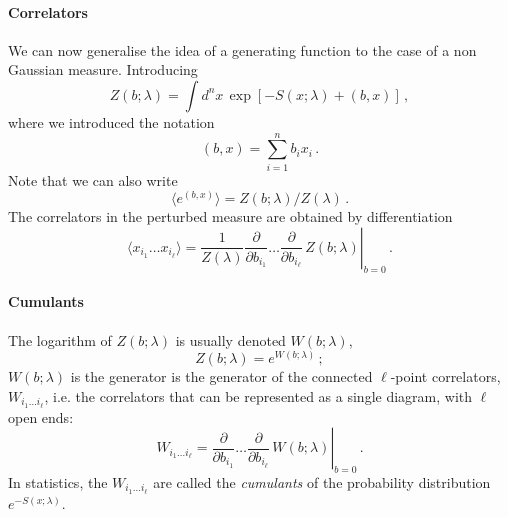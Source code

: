\documentclass[notes.tex]{subfiles}
\begin{document}
\paragraph{Correlators}

We can now generalise the idea of a generating function to the case of
a non Gaussian measure. Introducing
\begin{equation}
  \label{eq:GenFunctPert}
  Z(b;\lambda) = \int d^nx\, \exp\left[
    -S(x;\lambda) + (b,x)
    \right]\, ,
\end{equation}
where we introduced the notation
\begin{equation}
  \label{eq:ScalProd}
  (b,x) = \sum_{i=1}^n b_i x_i\, .
\end{equation}
Note that we can also write
\begin{equation}
  \label{eq:GenFunctPertTwo}
  \langle e^{(b,x)} \rangle = Z(b;\lambda)/Z(\lambda)\, .
\end{equation}
The correlators in the perturbed measure are obtained by
differentiation
\begin{equation}
  \label{eq:CorrGenPert}
  \langle x_{i_1} \ldots x_{i_\ell}\rangle = \frac{1}{Z(\lambda)} \left.
  \frac{\partial}{\partial b_{i_1}} \ldots \frac{\partial}{\partial b_{i_\ell}}\,
  Z(b;\lambda)
\right|_{b=0} \, .
\end{equation}

\paragraph{Cumulants}

The logarithm of $Z(b;\lambda)$ is usually denoted $W(b;\lambda)$, 
\begin{equation}
  \label{eq:WGenDef}
  Z(b;\lambda) = e^{W(b;\lambda)}\, ;
\end{equation}
$W(b;\lambda)$ is the generator is the generator of the connected
$\ell$-point correlators, $W_{i_1 \ldots i_\ell}$, i.e. the correlators that can be represented as a single
diagram, with $\ell$ open ends:
\begin{equation}
  \label{eq:DiffWGen}
  W_{i_1 \ldots i_\ell} = \left.
  \frac{\partial}{\partial b_{i_1}} \ldots \frac{\partial}{\partial b_{i_\ell}}\,
  W(b;\lambda)
\right|_{b=0} \, .
\end{equation}
In statistics, the $W_{i_1 \ldots i_\ell}$ are called the {\em
  cumulants} of the probability distribution $e^{-S(x;\lambda)}$.
\end{document}
